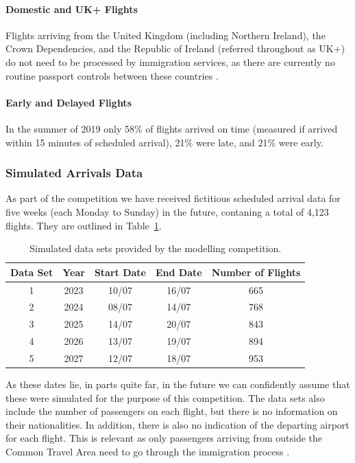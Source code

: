 \documentclass[10pt]{article}
\begin{document}
\paragraph{Domestic and UK+ Flights} Flights arriving from the United Kingdom (including Northern Ireland), the Crown Dependencies, and the Republic of Ireland (referred throughout as UK+) do not need to be processed by immigration services, as there are currently no routine passport controls between these countries \cite{common_travel_area}.

\paragraph{Early and Delayed Flights}
In the summer of 2019 only 58\% of flights arrived on time (measured if arrived within 15 minutes of scheduled arrival), 21\% were late, and 21\% were early. 

\subsubsection{Simulated Arrivals Data}
As part of the competition we have received fictitious scheduled arrival data for five weeks (each Monday to Sunday) in the future, contaning a total of 4,123 flights. They are outlined in Table~\ref{tab:future_arrivals_overview}.


\begin{table}[!ht]
\caption{Simulated data sets provided by the modelling competition.}
\label{tab:future_arrivals_overview}
\centering
\begin{tabular}{ccccc}
\hline
\multicolumn{1}{c}{\textbf{Data Set}} & \textbf{Year} & \textbf{Start Date} & \textbf{End Date} & \textbf{Number of Flights} \\ \hline
1  & 2023  & 10/07  & 16/07     & 665   \\
2  & 2024  & 08/07  & 14/07     & 768   \\
3  & 2025  & 14/07  & 20/07     & 843   \\
4  & 2026  & 13/07  & 19/07     & 894   \\
5  & 2027  & 12/07  & 18/07     & 953   \\ \hline
\end{tabular}
\end{table}

As these dates lie, in parts quite far, in the future we can confidently assume that these were simulated for the purpose of this competition. The data sets also include the number of passengers on each flight, but there is no information on their nationalities. In addition, there is also no indication of the departing airport for each flight. This is relevant as only passengers arriving from outside the Common Travel Area need to go through the immigration process \cite{common_travel_area}.
\end{document}
